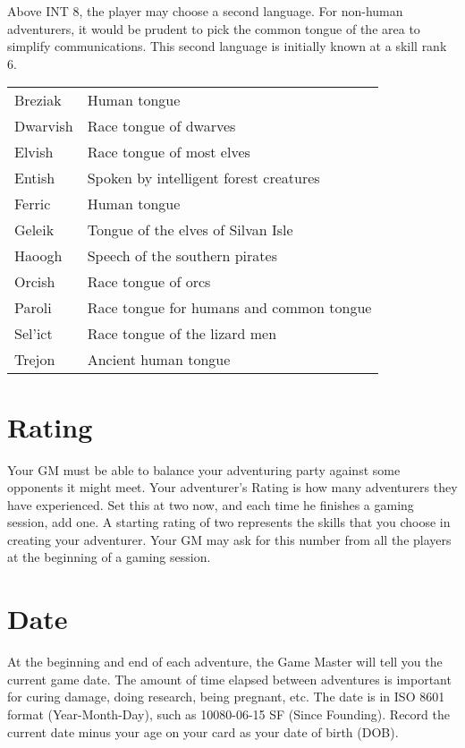 Above INT 8, the player may choose a second language. For non-human adventurers, it would be prudent to pick the common tongue of the area to simplify communications. This second language is initially known at a skill rank 6.

\begin{normbox}[Languages]

\small
\begin{tabularx}{\linewidth}{@{} l X }
Breziak & Human tongue\\
Dwarvish & Race tongue of dwarves\\
Elvish & Race tongue of most elves\\
Entish & Spoken by intelligent forest creatures\\
Ferric & Human tongue\\
Geleik & Tongue of the elves of Silvan Isle\\
Haoogh & Speech of the southern pirates\\
Orcish & Race tongue of orcs\\
Paroli & Race tongue for humans and common tongue\\
Sel'ict & Race tongue of the lizard men\\
Trejon & Ancient human tongue\\
\end{tabularx}
\normalsize
\end{normbox}
\setlength{\columnsep}{0.25cm}
\section{Rating}
Your GM must be able to balance your adventuring party against some opponents it might meet. Your adventurer's Rating is how many adventurers they have experienced. Set this at two now, and each time he finishes a gaming session, add one. A starting rating of two represents the skills that you choose in creating your adventurer. Your GM may ask for this number from all the players at the beginning of a gaming session.
\section{Date}

At the beginning and end of each adventure, the Game Master will tell you the current game date. The amount of time elapsed between adventures is important for curing damage, doing research, being pregnant, etc. The date is in ISO 8601 format (Year-Month-Day), such as 10080-06-15 SF (Since Founding). Record the current date minus your age on your card as your date of birth (DOB).
